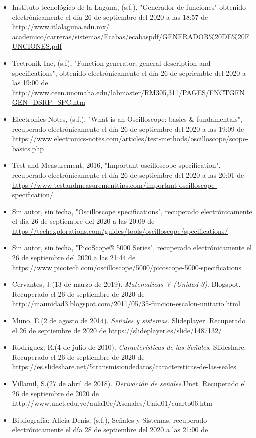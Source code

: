 \begin{itemize}
	\item Instituto tecnológico de la Laguna, (s.f.), "Generador de funciones" obtenido electrónicamente el día 26 de septiembre del 2020 a las 18:57 de \url{http://www.itlalaguna.edu.mx/
		academico/carreras/sistemas/Ecabas/ecabaspdf/GENERADOR\%20DE\%20FUNCIONES.pdf}
	\item Tectronik Inc, (s.f), "Function generator, general description and specifications", obtenido electrónicamente el día 26 de sepriembte del 2020 a las 19:00 de \url{http://www.ceen.unomaha.edu/labmaster/RM305,311/PAGES/FNCTGEN_GEN_DSRP_SPC.htm}
	\item Electronics Notes, (s.f.), "What is an Oscilloscope: basics \& fundamentals", recuperado electrónicamente el día 26 de septiembre del 2020 a las 19:09 de \url{https://www.electronics-notes.com/articles/test-methods/oscilloscope/scope-basics.php}
	\item Test and Measurement, 2016, "Important oscilloscope specification", recuperado electrónicamente el día 26 de septiembre del 2020 a las 20:01 de \\ \url{https://www.testandmeasurementtips.com/important-oscilloscope-specification/}
	\item Sin autor, sin fecha, "Oscilloscope specifications", recuperado electrónicamente el día 26 de septiembre del 2020 a las 20:09 de \url{https://techexplorations.com/guides/tools/oscilloscope/specifications/}
	\item Sin autor, sin fecha, "PicoScope® 5000 Series", recuperado electrónicamente el 26 de septiembre del 2020 a las 21:44 de \url{https://www.picotech.com/oscilloscope/5000/picoscope-5000-specifications}
	\item 	Cervantes, J.(13 de marzo de 2019).\textit{ Matematicas V (Unidad 3)}. Blogspot. Recuperado el 26 de septiembre de 2020 de http://maunidad3.blogspot.com/2011/05/35-funcion-escalon-unitario.html\\
	
	\item Muno, E.(2 de agosto de 2014).\textit{ Señales y sistemas}. Slideplayer. Recuperado el 26 de septiembre de 2020 de https://slideplayer.es/slide/1487132/\\
	
	\item Rodríguez, R.(4 de julio de 2010).\textit{ Características de las Señales}. Slideshare. Recuperado el 26 de septiembre de 2020 de https://es.slideshare.net/5transmisiondedatos/caractersticas-de-las-seales\\
	
	\item Villamil, S.(27 de abril de 2018).\textit{ Derivación de señales}.Unet. Recuperado el 26 de septiembre de 2020 de http://www.unet.edu.ve/aula10c/Asenales/Unid01/cuarto06.htm
	
	\item Bibliografía: Alicia Denis, (s.f.), Señales y Sistemas, recuperado electrónicamente el día 28 de septiembre del 2020 a las 21:00 de 
\end{itemize}